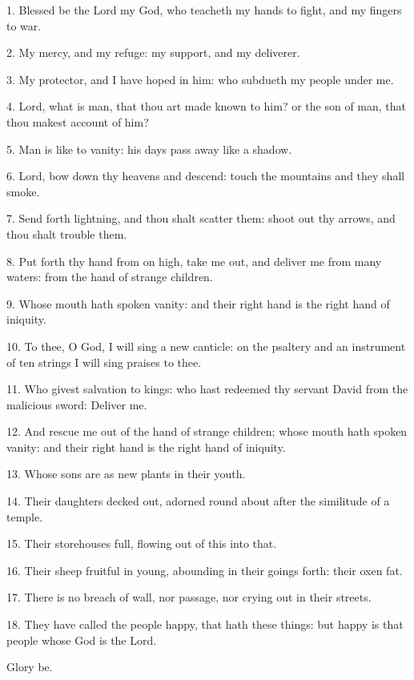  1.  Blessed be the Lord my God, who teacheth my hands to fight, and my fingers to war.
 
 2. My mercy, and my refuge: my support, and my deliverer.
 
 3. My protector, and I have hoped in him: who subdueth my people under me. 
 
 4. Lord, what is man, that thou art made known to him? or the son of man, that thou makest account of him? 
 
 5. Man is like to vanity: his days pass away like a shadow. 
 
 6. Lord, bow down thy heavens and descend: touch the mountains and they shall smoke.

7. Send forth lightning, and thou shalt scatter them:
shoot out thy arrows, and thou shalt trouble them.

8. Put forth thy hand from on high, take me out, and deliver me from many waters:
from the hand of strange children. 

9. Whose mouth hath spoken vanity: and their right hand is the right hand of iniquity. 

10. To thee, O God, I will sing a new canticle: on the psaltery and an instrument of ten strings I will sing praises to thee. 

11. Who givest salvation to kings: who hast redeemed thy servant David from the malicious sword: Deliver me.

12. And rescue me out of the hand of strange children; whose mouth hath spoken vanity:
and their right hand is the right hand of iniquity.

 13. Whose sons are as new plants in their youth.
 
 14. Their daughters decked out, adorned round about after the similitude of a temple. 
 
 15. Their storehouses full, flowing out of this into that.
 
 16. Their sheep fruitful in young, abounding in their goings forth: their oxen fat.
 
 17. There is no breach of wall, nor passage, nor crying out in their streets. 
 
 18. They have called the people happy, that hath these things: but happy is that people whose God is the Lord. 

Glory be.